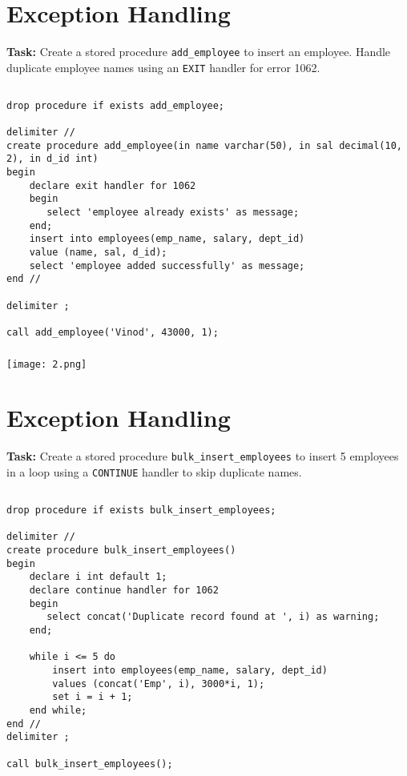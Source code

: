 \documentclass[12pt, a4paper]{article}
\begin{document}
\section{Exception Handling}
\textbf{Task:} Create a stored procedure \texttt{add\_employee} to insert an employee. 
Handle duplicate employee names using an \texttt{EXIT} handler for error 1062.

\subsection{}
\begin{lstlisting}
drop procedure if exists add_employee;

delimiter //
create procedure add_employee(in name varchar(50), in sal decimal(10, 2), in d_id int)
begin
    declare exit handler for 1062
    begin
	   select 'employee already exists' as message;
    end;
    insert into employees(emp_name, salary, dept_id)
    value (name, sal, d_id);
    select 'employee added successfully' as message;
end //

delimiter ;

call add_employee('Vinod', 43000, 1);
\end{lstlisting}

\subsubsection{}
\begin{center}
    \texttt{[image: 2.png]}
\end{center}

\section{Exception Handling}
\textbf{Task:} Create a stored procedure \texttt{bulk\_insert\_employees} to insert 5 employees 
in a loop using a \texttt{CONTINUE} handler to skip duplicate names.

\subsection{}
\begin{lstlisting}
drop procedure if exists bulk_insert_employees;

delimiter //
create procedure bulk_insert_employees()
begin
    declare i int default 1;
    declare continue handler for 1062
    begin
	   select concat('Duplicate record found at ', i) as warning;
    end;
    
    while i <= 5 do
        insert into employees(emp_name, salary, dept_id)
        values (concat('Emp', i), 3000*i, 1);
        set i = i + 1;
	end while;
end //
delimiter ;

call bulk_insert_employees();
\end{lstlisting}
\end{document}
